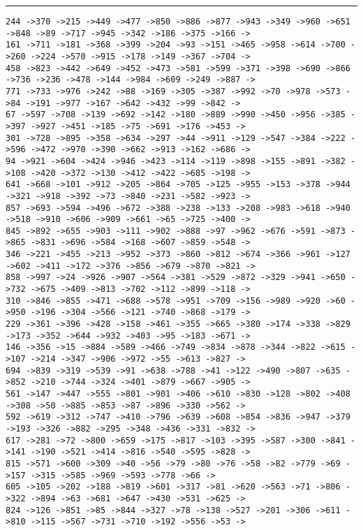 \documentclass[letter, 12pt]{article}
\newenvironment{question}[1]{%
    \vspace{.2in}%
        \noindent{\bf #1}%
    \vspace{0.3em} \hrule \vspace{.1in}%
}{}
\begin{document}
\begin{question}{\large Appendix}
\begin{lstlisting}[style=CStyle]
244 ->370 ->215 ->449 ->477 ->850 ->886 ->877 ->943 ->349 ->960 ->651 ->848 ->89 ->717 ->945 ->342 ->186 ->375 ->166 ->
161 ->711 ->181 ->368 ->399 ->204 ->93 ->151 ->465 ->958 ->614 ->700 ->260 ->224 ->570 ->915 ->178 ->149 ->367 ->704 ->
458 ->823 ->442 ->649 ->452 ->473 ->581 ->599 ->371 ->398 ->690 ->866 ->736 ->236 ->478 ->144 ->984 ->609 ->249 ->887 ->
771 ->733 ->976 ->242 ->88 ->169 ->305 ->387 ->992 ->70 ->978 ->573 ->84 ->191 ->977 ->167 ->642 ->432 ->99 ->842 ->
67 ->597 ->708 ->139 ->692 ->142 ->180 ->889 ->990 ->450 ->956 ->385 ->397 ->927 ->451 ->185 ->75 ->691 ->176 ->453 ->
301 ->728 ->895 ->358 ->634 ->297 ->44 ->911 ->129 ->547 ->384 ->222 ->596 ->472 ->970 ->390 ->662 ->913 ->162 ->686 ->
94 ->921 ->604 ->424 ->946 ->423 ->114 ->119 ->898 ->155 ->891 ->382 ->108 ->420 ->372 ->130 ->412 ->422 ->685 ->198 ->
641 ->668 ->101 ->912 ->205 ->864 ->705 ->125 ->955 ->153 ->378 ->944 ->321 ->918 ->392 ->73 ->840 ->231 ->582 ->923 ->
857 ->693 ->594 ->496 ->672 ->388 ->238 ->133 ->208 ->983 ->618 ->940 ->518 ->910 ->606 ->909 ->661 ->65 ->725 ->400 ->
845 ->892 ->655 ->903 ->111 ->902 ->888 ->97 ->962 ->676 ->591 ->873 ->865 ->831 ->696 ->584 ->168 ->607 ->859 ->548 ->
346 ->221 ->455 ->213 ->952 ->373 ->860 ->812 ->674 ->366 ->961 ->127 ->602 ->411 ->172 ->376 ->856 ->679 ->870 ->821 ->
858 ->997 ->24 ->926 ->907 ->564 ->381 ->529 ->872 ->329 ->941 ->650 ->732 ->675 ->409 ->813 ->702 ->112 ->899 ->118 ->
310 ->846 ->855 ->471 ->688 ->578 ->951 ->709 ->156 ->989 ->920 ->60 ->950 ->196 ->304 ->566 ->121 ->740 ->868 ->179 ->
229 ->361 ->396 ->428 ->158 ->461 ->355 ->665 ->380 ->174 ->338 ->829 ->173 ->352 ->644 ->932 ->403 ->95 ->183 ->671 ->
146 ->356 ->15 ->884 ->589 ->466 ->749 ->834 ->878 ->344 ->822 ->615 ->107 ->214 ->347 ->906 ->972 ->55 ->613 ->827 ->
694 ->839 ->319 ->539 ->91 ->638 ->788 ->41 ->122 ->490 ->807 ->635 ->852 ->210 ->744 ->324 ->401 ->879 ->667 ->905 ->
561 ->147 ->447 ->555 ->801 ->901 ->406 ->610 ->830 ->128 ->802 ->408 ->308 ->50 ->885 ->853 ->87 ->896 ->330 ->562 ->
592 ->619 ->312 ->747 ->410 ->796 ->639 ->608 ->854 ->836 ->947 ->379 ->193 ->326 ->882 ->295 ->348 ->436 ->331 ->832 ->
617 ->281 ->72 ->800 ->659 ->175 ->817 ->103 ->395 ->587 ->300 ->841 ->141 ->190 ->521 ->414 ->816 ->540 ->595 ->828 ->
815 ->571 ->600 ->309 ->40 ->56 ->79 ->80 ->76 ->58 ->82 ->779 ->69 ->157 ->315 ->585 ->969 ->593 ->778 ->66 ->
605 ->105 ->202 ->188 ->819 ->601 ->317 ->81 ->620 ->563 ->71 ->806 ->322 ->894 ->63 ->681 ->647 ->430 ->531 ->625 ->
824 ->126 ->851 ->85 ->844 ->327 ->78 ->138 ->527 ->201 ->306 ->611 ->810 ->115 ->567 ->731 ->710 ->192 ->556 ->53 ->

\end{lstlisting}
\end{question}
\end{document}
